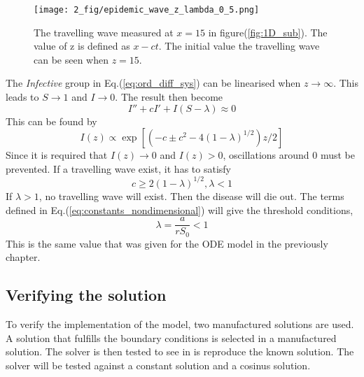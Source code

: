 \documentclass[%
twoside,                 %
final,                   %
chapterprefix=true,      %
open=right               %
10pt]{book}
\begin{document}
\begin{figure}[ht]
  \centerline{\texttt{[image: 2\_fig/epidemic\_wave\_z\_lambda\_0\_5.png]}}
  \caption{
  \label{fig:1D_tw} The travelling wave measured at $x=15$ in figure(\ref{fig:1D_sub}). The value of z is defined as $x-ct$. The initial value the travelling wave can be seen when $z=15$.
  }
\end{figure}




\vspace{3mm}


The \emph{Infective} group in Eq.(\ref{eq:ord_diff_sys}) can be linearised when $z\rightarrow \infty$. This leads to $S\rightarrow 1$ and $I \rightarrow 0$. The result then become 
\begin{equation}
	I'' + cI' + I(S-\lambda) \approx 0 
\end{equation}
This can be found by
\begin{equation}
I(z) \propto \exp\left[(-c \pm {c^2 -4(1-\lambda)}^{1/2})z/2\right]
\end{equation}
Since it is required that $I(z)\rightarrow 0$ and $I(z) > 0$, oscillations around 0 must be prevented. If a travelling wave exist, it has to satisfy
\begin{equation}
	c \geq 2(1-\lambda)^{1/2}, \lambda < 1
\end{equation}
If $\lambda > 1$, no travelling wave will exist. Then the disease will die out. The terms defined in Eq.(\ref{eq:constants_nondimensional}) will give the threshold conditions,
\begin{equation}
	\lambda = \frac{a}{rS_0} < 1
\end{equation}
This is the same value that was given for the ODE model in the previously chapter.
\subsection{Verifying the solution}
To verify the implementation of the model, two manufactured solutions are used. A solution that fulfills the boundary conditions is selected in a manufactured solution. The solver is then tested to see in is reproduce the known solution. The solver will be tested against a constant solution and a cosinus solution. 
\end{document}
